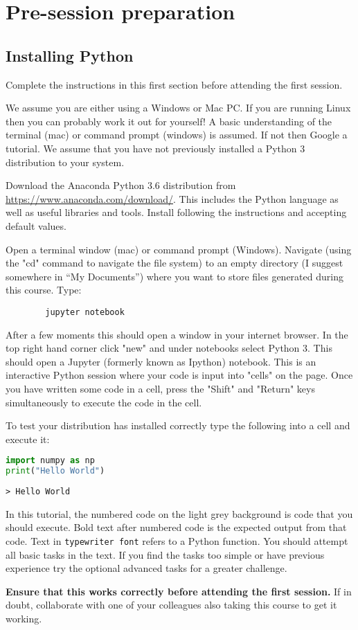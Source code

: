 \section{Pre-session preparation}
\subsection{Installing Python}
	Complete the instructions in this first section before attending the first session.
	
	We assume you are either using a Windows or Mac PC. If you are running Linux then you can probably work it out for yourself! A basic understanding of the terminal (mac) or command prompt (windows) is assumed. If not then Google a tutorial. We assume that you have not previously installed a Python 3 distribution to your system.
	
	Download the Anaconda Python 3.6 distribution from \url{https://www.anaconda.com/download/}. This includes the Python language as well as useful libraries and tools. Install following the instructions and accepting default values.

	Open a terminal window (mac) or command prompt (Windows). Navigate (using the "cd" command to navigate the file system) to an empty directory (I suggest somewhere in ``My Documents'') where you want to store files generated during this course. Type:
	\begin{verbatim}
		jupyter notebook
	\end{verbatim}

After a few moments this should open a window in your internet browser. In the top right hand corner click "new" and under notebooks select Python 3. This should open a Jupyter (formerly known as Ipython) notebook. This is an interactive Python session where your code is input into "cells" on the page. Once you have written some code in a cell, press the "Shift" and "Return" keys simultaneously to execute the code in the cell.

To test your distribution has installed correctly type the following into a cell and execute it:

		\begin{lstlisting}[language=Python]
import numpy as np
print("Hello World")\end{lstlisting}
		\begin{verbatim}> Hello World\end{verbatim}
		
In this tutorial, the numbered code on the light grey background is code that you should execute. Bold text after numbered code is the expected output from that code. Text in \texttt{typewriter font} refers to a Python function. You should attempt all basic tasks in the text. If you find the tasks too simple or have previous experience try the optional advanced tasks for a greater challenge.

\textbf{Ensure that this works correctly before attending the first session.} If in doubt, collaborate with one of your colleagues also taking this course to get it working.